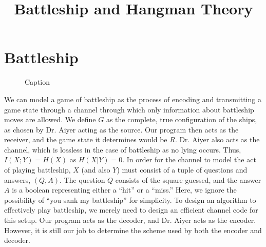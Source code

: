 \documentclass[conference,letterpaper]{IEEEtran}
\begin{document}
    \title{Battleship and Hangman Theory}
    \author{
    \IEEEauthorblockA{} \and {}}
    \maketitle
    \IEEEpeerreviewmaketitle


    \section{Battleship}

    \begin{figure}
        \centering
        \caption{Caption}
        \label{scheme}
    \end{figure}

    We can model a game of battleship as the process of encoding and transmitting a game state through a channel through which only information about battleship moves are allowed. We define $G$ as the complete, true configuration of the ships, as chosen by Dr. Aiyer acting as the source. Our program then acts as the receiver, and the game state it determines would be $R$. Dr. Aiyer also acts as the channel, which is lossless in the case of battleship as no lying occurs. Thus, $I(X;Y) = H(X)$ as $H(X|Y) = 0$. In order for the channel to model the act of playing battleship, $X$ (and also $Y$) must consist of a tuple of questions and answers, $(Q,A)$. The question $Q$ consists of the square guessed, and the answer $A$ is a boolean representing either a ``hit'' or a ``miss.'' Here, we ignore the possibility of ``you sank my battleship'' for simplicity. To design an algorithm to effectively play battleship, we merely need to design an efficient channel code for this setup. Our program acts as the decoder, and Dr. Aiyer acts as the encoder. However, it is still our job to determine the scheme used by both the encoder and decoder.
\end{document}
